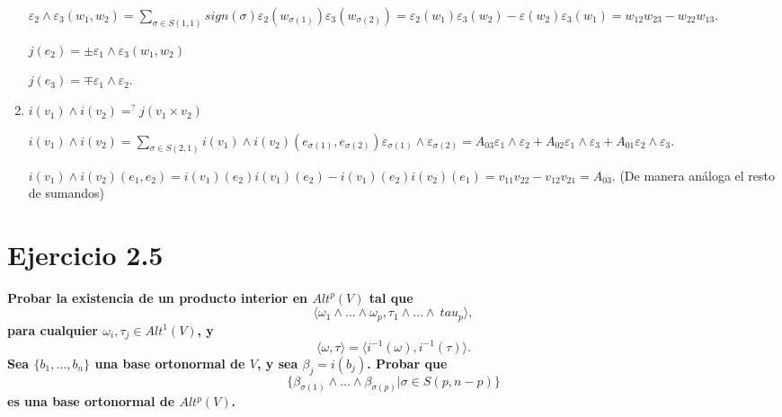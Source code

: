 \documentclass{article}
\newenvironment{itemize*}%
  {\vspace*{-0mm}
   \begin{itemize}%
    \setlength{\itemsep}{0pt}%
    \setlength{\parskip}{0pt}}%
  {\vspace*{-0mm}
   \end{itemize}}
\begin{document}
\begin{enumerate}
\begin{itemize*}
    $\varepsilon_2\wedge \varepsilon_3(w_1,w_2)=\sum_{\sigma \in S(1,1)} sign(\sigma) \varepsilon_2(w_{\sigma(1)})\varepsilon_3(w_{\sigma(2)})=\varepsilon_2(w_1)\varepsilon_3(w_2)-\varepsilon(w_2)\varepsilon_3(w_1)=w_{12}w_{23}-w_{22}w_{13}.$

    $j(e_2)=\pm  \varepsilon_1\wedge \varepsilon_3(w_1,w_2)$
    
    $j(e_3)=\mp \varepsilon_1\wedge \varepsilon_2$.

  \end{itemize*}

  \item $i(v_1)\wedge i(v_2)=^? j(v_1\times v_2)$

    $i(v_1)\wedge i(v_2)=\sum_{\sigma \in S(2,1)}i(v_1)\wedge i(v_2) (e_{\sigma(1)},e_{\sigma(2)})\varepsilon_{\sigma(1)} \wedge \varepsilon_{\sigma(2)}=A_{03} \varepsilon_1 \wedge \varepsilon_2 + A_{02}\varepsilon_1 \wedge \varepsilon_3 + A_{01}\varepsilon_2 \wedge \varepsilon_3$. 

    $i(v_1)\wedge i(v_2)(e_1,e_2)=i(v_1)(e_2)i(v_1)(e_2)-i(v_1)(e_2)i(v_2)(e_1)=v_{11}v_{22}-v_{12}v_{21}=A_{03}$. (De manera análoga el resto de sumandos)
\end{enumerate}

\section{Ejercicio 2.5}

\textbf{Probar la existencia de un producto interior en $Alt^p(V)$ tal que}
$$ \langle \omega_1\wedge \dots \wedge \omega_p,\tau_1\wedge \dots \wedge \ tau_p \rangle,$$
\textbf{para cualquier $\omega_i,\tau_j\in Alt^1(V)$, y}
$$\langle \omega,\tau \rangle = \langle i^{-1}(\omega),i^{-1}(\tau)\rangle . $$
\textbf{Sea $\{ b_1,\dots,b_n\}$ una base ortonormal de $V$, y sea $\beta_j=i(b_j)$. Probar que}
$$\{\beta_{\sigma(1)}\wedge \dots \wedge \beta_{\sigma(p)} | \sigma \in S(p,n-p)\} $$
\textbf{es una base ortonormal de $Alt^p(V)$.}
\end{document}

